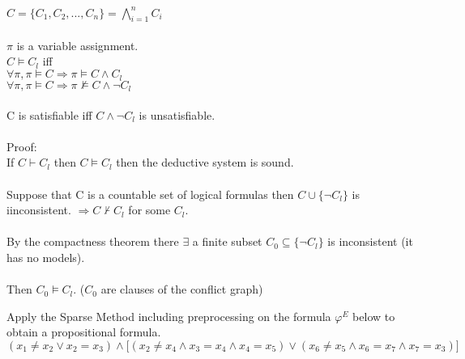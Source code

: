 \documentclass[11pt,a4paper]{uebung}
\begin{document}
\begin{enumerate}
{  $C=\{C_1, C_2,... ,C_n\} = \bigwedge_{i=1}^{n} C_i$\\
  \\
  $\pi$ is a variable assignment.\\
  $C \vDash C_l$ iff\\
  $\forall \pi, \pi \vDash C \Rightarrow \pi \vDash C \wedge C_l$\\
  $\forall \pi, \pi \vDash C \Rightarrow \pi \nvDash C \wedge \neg C_l$\\
  \\
  C is satisfiable iff $C \wedge \neg C_l$ is unsatisfiable.\\
  \\
  Proof:\\
  If $C \vdash C_l$ then $C \vDash C_l$ then the deductive system is sound.\\
  \\
  Suppose that C is a countable set of logical formulas then $C \cup \{\neg C_l\}$ is iinconsistent.
  $\Rightarrow C \nvdash C_l$ for some $C_l$.\\
  \\
  By the compactness theorem there $\exists$ a finite subset $C_0 \subseteq \{\neg C_l\}$ is inconsistent (it has no models).\\
  \\
  Then $C_0 \vDash C_l$. ($C_0$ are clauses of the conflict graph)
  
  }
\end{enumerate}



\newpage
{}
Apply the Sparse Method including preprocessing on the formula $\varphi^E$
below to obtain a propositional formula.
\begin{displaymath}
  (x_1 \neq x_2 \lor x_2=x_3 ) \land \big[ (x_2 \neq x_4 \land x_3=x_4
  \land x_4=x_5)
  \lor (x_6 \neq x_5 \land x_6=x_7 \land x_7=x_3)\big]
\end{displaymath}
\end{document}
